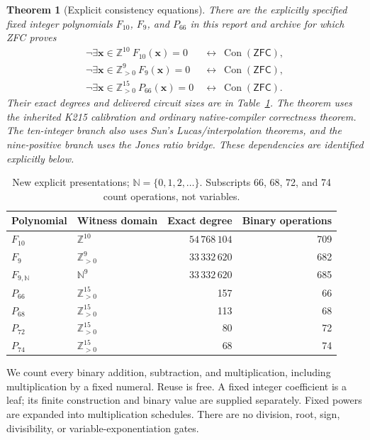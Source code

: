 \documentclass[11pt,letterpaper]{article}
\newtheorem{theorem}{Theorem}[section]
\theoremstyle{remark}\newtheorem{remark}[theorem]{Remark}
\newcommand{\Z}{\mathbb Z}\newcommand{\N}{\mathbb N}
\newcommand{\Pos}{\mathbb Z_{>0}}
\newcommand{\Con}{\operatorname{Con}}\newcommand{\ZFC}{\mathsf{ZFC}}
\begin{document}
\begin{theorem}[Explicit consistency equations]\label{thm:main}
There are the explicitly specified fixed integer polynomials $F_{10}$,
$F_9$, and $P_{66}$ in this report and archive for which ZFC proves
\begin{align*}
 \neg\exists\mathbf x\in\Z^{10}\ F_{10}(\mathbf x)=0
 &\ \longleftrightarrow\ \Con(\ZFC),\\
 \neg\exists\mathbf x\in\Pos^9\ F_9(\mathbf x)=0
 &\ \longleftrightarrow\ \Con(\ZFC),\\
 \neg\exists\mathbf x\in\Pos^{15}\ P_{66}(\mathbf x)=0
 &\ \longleftrightarrow\ \Con(\ZFC).
\end{align*}
Their exact degrees and delivered circuit sizes are in
Table~\ref{tab:new}. The theorem uses the inherited K215 calibration and
ordinary native-compiler correctness theorem. The ten-integer branch also
uses Sun's Lucas/interpolation theorems, and the nine-positive branch uses
the Jones ratio bridge. These dependencies are identified explicitly below.
\end{theorem}

\begin{table}[h]
\centering
\begin{tabular}{@{}llrr@{}}\toprule
Polynomial & Witness domain & Exact degree & Binary operations\\\midrule
$F_{10}$ & $\Z^{10}$ & $54\,768\,104$ & 709\\
$F_9$ & $\Pos^9$ & $33\,332\,620$ & 682\\
$F_{9,\N}$ & $\N^9$ & $33\,332\,620$ & 685\\
$P_{66}$ & $\Pos^{15}$ & 157 & 66\\
$P_{68}$ & $\Pos^{15}$ & 113 & 68\\
$P_{72}$ & $\Pos^{15}$ & 80 & 72\\
$P_{74}$ & $\Pos^{15}$ & 68 & 74\\\bottomrule
\end{tabular}
\caption{New explicit presentations; $\N=\{0,1,2,\ldots\}$.
Subscripts 66, 68, 72, and 74 count operations, not variables.}\label{tab:new}
\end{table}

We count every binary addition, subtraction, and multiplication,
including multiplication by a fixed numeral. Reuse is free. A fixed
integer coefficient is a leaf; its finite construction and binary value
are supplied separately. Fixed powers are expanded into multiplication
schedules. There are no division, root, sign, divisibility, or
variable-exponentiation gates.
\end{document}
